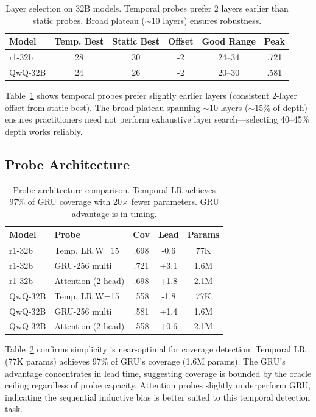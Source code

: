 \documentclass[11pt,a4paper]{article}
\begin{document}
\begin{table}[t]
\centering
\small
\begin{tabular}{lccccc}
\toprule
Model & Temp. Best & Static Best & Offset & Good Range & Peak \\
\midrule
r1-32b & 28 & 30 & -2 & 24--34 & .721 \\
QwQ-32B & 24 & 26 & -2 & 20--30 & .581 \\
\bottomrule
\end{tabular}
\caption{Layer selection on 32B models. Temporal probes prefer 2 layers earlier than static probes. Broad plateau ($\sim$10 layers) ensures robustness.}
\label{tab:layer}
\end{table}

Table~\ref{tab:layer} shows temporal probes prefer slightly earlier layers (consistent 2-layer offset from static best). The broad plateau spanning $\sim$10 layers ($\sim$15\% of depth) ensures practitioners need not perform exhaustive layer search---selecting 40--45\% depth works reliably.

\subsection{Probe Architecture}

\begin{table}[t]
\centering
\small
\begin{tabular}{llccc}
\toprule
Model & Probe & Cov & Lead & Params \\
\midrule
r1-32b & Temp. LR W=15 & .698 & -0.6 & 77K \\
r1-32b & GRU-256 multi & .721 & +3.1 & 1.6M \\
r1-32b & Attention (2-head) & .698 & +1.8 & 2.1M \\
QwQ-32B & Temp. LR W=15 & .558 & -1.8 & 77K \\
QwQ-32B & GRU-256 multi & .581 & +1.4 & 1.6M \\
QwQ-32B & Attention (2-head) & .558 & +0.6 & 2.1M \\
\bottomrule
\end{tabular}
\caption{Probe architecture comparison. Temporal LR achieves 97\% of GRU coverage with 20$\times$ fewer parameters. GRU advantage is in timing.}
\label{tab:probe_arch}
\end{table}

Table~\ref{tab:probe_arch} confirms simplicity is near-optimal for coverage detection. Temporal LR (77K params) achieves 97\% of GRU's coverage (1.6M params). The GRU's advantage concentrates in lead time, suggesting coverage is bounded by the oracle ceiling regardless of probe capacity. Attention probes slightly underperform GRU, indicating the sequential inductive bias is better suited to this temporal detection task.
\end{document}
